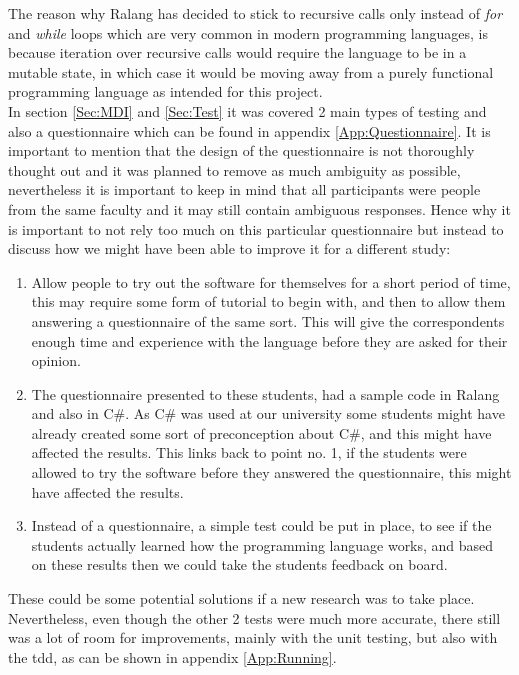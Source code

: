 \documentclass[a4paper]{article}
\begin{document}
	The reason why Ralang has decided to stick to recursive calls only instead of \textit{for} and \textit{while} loops which are very common in modern programming languages, is because iteration over recursive calls would require the language to be in a mutable state, in which case it would be moving away from a purely functional programming language as intended for this project.\\
	
	In section \ref{Sec:MDI} and \ref{Sec:Test} it was covered 2 main types of testing and also a questionnaire which can be found in appendix \ref{App:Questionnaire}. It is important to mention that the design of the questionnaire is not thoroughly thought out and it was planned to remove as much ambiguity as possible, nevertheless it is important to keep in mind that all participants were people from the same faculty and it may still contain ambiguous responses. Hence why it is important to not rely too much on this particular questionnaire but instead to discuss how we might have been able to improve it for a different study:
	\begin{enumerate}
		\item Allow people to try out the software for themselves for a short period of time, this may require some form of tutorial to begin with, and then to allow them answering a questionnaire of the same sort. This will give the correspondents enough time and experience with the language before they are asked for their opinion.
		\item The questionnaire presented to these students, had a sample code in Ralang and also in C\#. As C\# was used at our university some students might have already created some sort of preconception about C\#, and this might have affected the results. This links back to point no. 1, if the students were allowed to try the software before they answered the questionnaire, this might have affected the results.
		\item Instead of a questionnaire, a simple test could be put in place, to see if the students actually learned how the programming language works, and based on these results then we could take the students feedback on board.
	\end{enumerate}
	These could be some potential solutions if a new research was to take place. Nevertheless, even though the other 2 tests were much more accurate, there still was a lot of room for improvements, mainly with the unit testing, but also with the \ac{tdd}, as can be shown in appendix \ref{App:Running}.\\
	
\end{document}
